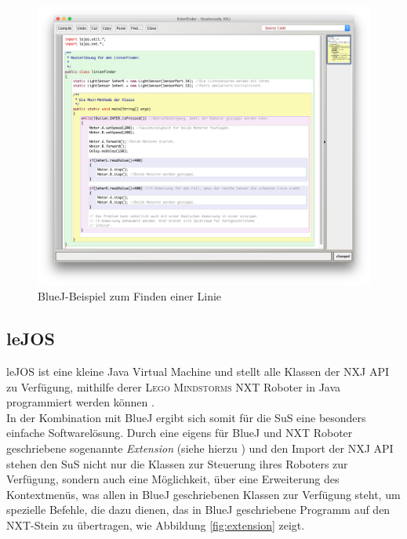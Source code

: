 \documentclass[paper=a4, pagesize, DIV=calc, BCOR=15.5mm, twoside=on, onecolumn=on, open = right, titlepage =on, parskip =half-, headsepline = on, footsepline = on, chapterprefix = on, appendixprefix = off, fontsize = 12pt, numbers = noenddot, abstract = on]{scrbook}
\numberwithin{equation}{chapter}
\theoremstyle{definition}
\theoremstyle{plain}
\theoremstyle{plain}
\theoremstyle{remark}
\theoremstyle{plain}
\theoremstyle{plain}
\begin{document}
\begin{figure}[htpb]
\centering
\includegraphics[scale=0.35]{images/linienfinder_bluej.png} 
\caption{BlueJ-Beispiel zum Finden einer Linie}
\label{fig:Bsp BlueJ Linienfinder}
\end{figure}



\par \singlespacing
\subsection{leJOS}
\label{sec:lejos}
\onehalfspacing
leJOS ist eine kleine Java Virtual Machine und stellt alle Klassen der NXJ API zu Verfügung, mithilfe derer \textsc{Lego Mindstorms} NXT Roboter in Java programmiert werden können \cite{lejos}.\\
In der Kombination mit BlueJ ergibt sich somit für die SuS eine besonders einfache Softwarelösung. Durch eine eigens für BlueJ und NXT Roboter geschriebene sogenannte \textit{Extension} (siehe hierzu \cite{bowes:12}) und den Import der NXJ API stehen den SuS nicht nur die Klassen zur Steuerung ihres Roboters zur Verfügung, sondern auch eine Möglichkeit, über eine Erweiterung des Kontextmenüs, was allen in BlueJ geschriebenen Klassen zur Verfügung steht, um spezielle Befehle, die dazu dienen, das in BlueJ geschriebene Programm auf den NXT-Stein zu übertragen, wie Abbildung \ref{fig:extension} zeigt.
\end{document}
